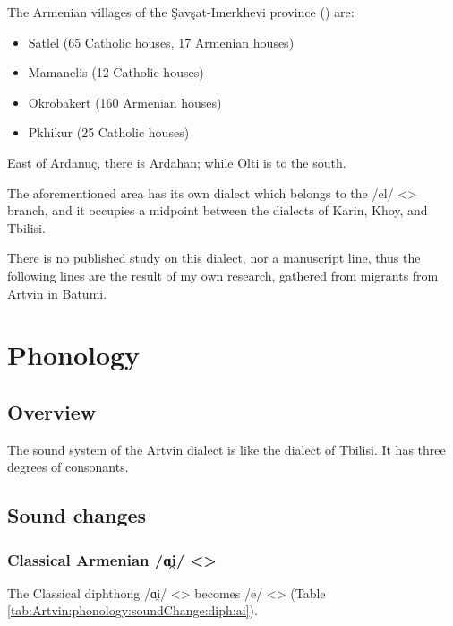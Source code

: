 The Armenian villages of the Şavşat-Imerkhevi province () are:
\begin{itemize}
	\item Satlel (65 Catholic houses, 17 Armenian houses)
	\item Mamanelis (12 Catholic houses)
	\item Okrobakert (160 Armenian houses)
	\item Pkhikur (25 Catholic houses)
	
\end{itemize}

East of Ardanuç, there is Ardahan; while Olti is to the south. 

The aforementioned area has its own dialect which belongs to the /el/ <> branch, and it occupies a midpoint between the dialects of Karin, Khoy, and Tbilisi. 

There is no published study on this dialect, nor a manuscript line, thus the following lines are the result of my own research, gathered from migrants from Artvin in Batumi. 

\section{Phonology}
\subsection{Overview}
The sound system of the Artvin dialect is like the dialect of Tbilisi. It has three degrees of consonants. 
\subsection{Sound changes}
\subsubsection{Classical Armenian /ɑi̯/ <>}

The Classical diphthong /ɑi̯/ <> becomes /e/ <> (Table \ref{tab:Artvin:phonology:soundChange:diph:ai}). 


